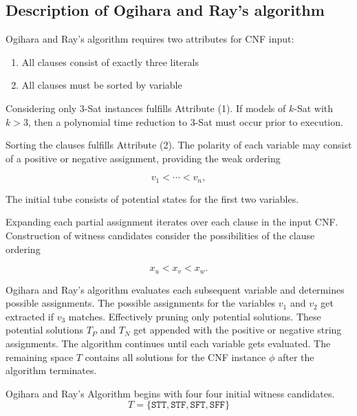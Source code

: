 \subsection{Description of Ogihara and Ray's algorithm}
		
Ogihara and Ray's algorithm requires two attributes for CNF input:

\begin{enumerate}
\item All clauses consist of exactly three literals
\item All clauses must be sorted by variable
\end{enumerate}

Considering only $3$-{\sc Sat} instances fulfills Attribute (1).  If models of $k$-{\sc Sat} with $k > 3$, then a polynomial time reduction to $3$-{\sc Sat} must occur prior to execution.

Sorting the clauses fulfills Attribute (2).  The polarity of each variable may consist of a positive or negative assignment, providing the weak ordering

\[
v_1 < \cdots < v_n,
\]

The initial tube consists of potential states for the first two variables.


Expanding each partial assignment iterates over each clause in the input CNF.  Construction of witness candidates consider the possibilities of the clause ordering

\[
x_u < x_v < x_w.
\]

Ogihara and Ray's algorithm evaluates each subsequent variable and determines possible assignments.  The possible assignments for the variables $v_1$ and $v_2$ get extracted if $v_3$ matches.  Effectively pruning only potential solutions.  These potential solutions $T_P$ and $T_N$ get appended with the positive or negative string assignments.  The algorithm continues until each variable gets evaluated.  The remaining space $T$ contains all solutions for the CNF instance $\phi$ after the algorithm terminates.



\FloatBarrier

{\sc Ogihara and Ray's Algorithm} begins with four four initial witness candidates. 
\[
T = \{ \texttt{STT}, \texttt{STF}, \texttt{SFT}, \texttt{SFF}\}
\]

